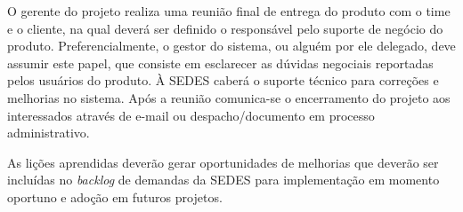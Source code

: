 O gerente do projeto realiza uma reunião final de entrega do produto com o time e o cliente, na qual deverá ser definido o responsável pelo suporte de negócio do produto. Preferencialmente, o gestor do sistema, ou alguém por ele delegado, deve assumir este papel, que consiste em esclarecer as dúvidas negociais reportadas pelos usuários do produto. À SEDES caberá o suporte técnico para correções e melhorias no sistema. Após a reunião comunica-se o encerramento do projeto aos interessados através de e-mail ou despacho/documento em processo administrativo.

As lições aprendidas deverão gerar oportunidades de melhorias que deverão ser incluídas no \textit{backlog} de demandas da SEDES para implementação em momento oportuno e adoção em futuros projetos.